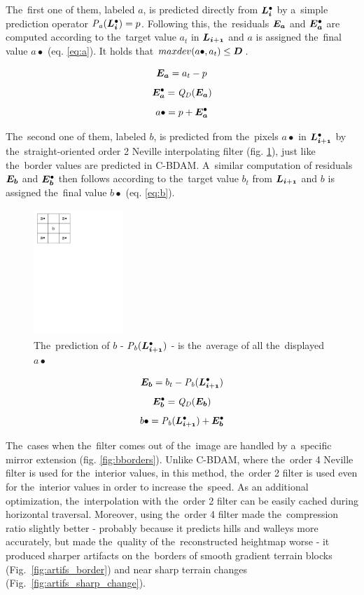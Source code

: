 The~first one of them, labeled $a$, is predicted directly from $\ldot{i}$ by a~simple prediction operator $\opnorm{P}{a}(\ldot{i}) = p$. Following this, the~residuals $\objnorm{E}{a}$ and $\objdot{E}{a}$ are computed according to the~target value $a_t$ in $\lnorm{i+1}$ and $a$ is assigned the~final value $a\bullet$ (eq. \ref{eq:a}). It holds that  $maxdev(a\bullet, a_{t}) \leq \objnorm{D}{}$.

$$\objnorm{E}{a} = a_t - p$$
$$\objdot{E}{a} = \opnorm{Q}{D}(\objnorm{E}{a})$$
\begin{equation}
\label{eq:a}
a\bullet = p + \objdot{E}{a}
\end{equation}

The~second one of them, labeled $b$, is predicted from the~pixels $a\bullet$ in $\ldot{i+1}$ by the~straight-oriented order 2 Neville interpolating filter (fig. \ref{fig:bcomp}), just like the~border values are predicted in C-BDAM. A~similar computation of residuals $\objnorm{E}{b}$ and $\objdot{E}{b}$ then follows according to the~target value $b_t$ from $\lnorm{i+1}$ and $b$ is assigned the~final value $b\bullet$ (eq. \ref{eq:b}).

\begin{figure}
	\includegraphics[trim={0 21cm 10cm 0}, clip, width=0.3\textwidth]{figures/bcomp.pdf}\centering
	\caption{The~prediction of $b$ - $\opnorm{P}{b}(\ldot{i+1})$ - is the~average of all the~displayed $a\bullet$}
	\label{fig:bcomp}
\end{figure}

$$\objnorm{E}{b} = b_t - \opnorm{P}{b}(\ldot{i+1})$$
$$\objdot{E}{b} = \opnorm{Q}{D}(\objnorm{E}{b})$$
\begin{equation}
\label{eq:b}
b\bullet = \opnorm{P}{b}(\ldot{i+1}) + \objdot{E}{b}
\end{equation}

The~cases when the~filter comes out of the~image are handled by a~specific mirror extension (fig. \ref{fig:bborders}). Unlike C-BDAM, where the~order 4 Neville filter is used for the~interior values, in this method, the~order 2 filter is used even for the~interior values in order to increase the~speed. As an additional optimization, the~interpolation with the~order 2 filter can be easily cached during horizontal traversal. Moreover, using the~order 4 filter made the~compression ratio slightly better - probably because it predicts hills and walleys more accurately, but made the~quality of the~reconstructed heightmap worse - it produced sharper artifacts on the~borders of smooth gradient terrain blocks (Fig.~\ref{fig:artifs_border}) and near sharp terrain changes (Fig.~\ref{fig:artifs_sharp_change}).

